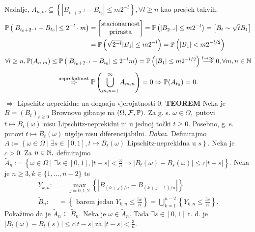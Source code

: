 \documentclass{article}
\begin{document}
Nadalje, \(A_{n,m}\subseteq\left\{\left|B_{t_0+2^{-l}}-B_{t_0}\right|\le m2^{-l}\right\},\forall l\ge n\) kao presjek takvih. \[\begin{aligned}\Bbb P\left(\left|B_{t_0+2^{-l}}-B_{t_0}\right|\le 2^{-l}\cdot m\right)&=\begin{bmatrix}\text{stacionarnost}\\\text{prirasta}\end{bmatrix}=\Bbb P\left(\left|B_{2^{-l}}\right|\le m2^{-l}\right)=\begin{bmatrix}B_t\sim\sqrt tB_1\end{bmatrix}\\&=\Bbb P\left(\sqrt{2^{-l}}|B_1|\le m2^{-l}\right)=\Bbb P\left(|B_1|<m2^{-l/2}\right)\end{aligned}\]
\[\forall l\ge n,\Bbb P(A_{n,m})\le\Bbb P\left(\left|B_{t_0+2^{-l}}-B_{t_0}\right|\le 2^{-l}m\right)=\Bbb P\left(|B_1|\le m2^{-l/2}\right)\overset{l\to\infty}{\longrightarrow}0,\forall m,n\in\Bbb N\] \[\overset{\text{neprekidnost}}{\Rightarrow}\Bbb P\left(\bigcup_{m,n=1}^\infty A_{m,n}\right)=0\Rightarrow\Bbb P(A_{t_0})=0.\] \(\Rightarrow\) Lipschitz-neprekidne na doga\dj{}aju vjerojatnosti \(0.\)\newline\newline
\textbf{TEOREM}\newline
Neka je \(B=(B_t)_{t\ge0}\) Brownovo gibanje na \((\Omega,\mathcal F,\Bbb P).\) Za g. s. \(\omega\in\Omega,\) putovi \(t\mapsto B_t(\omega)\) nisu Lipschitz-neprekidni ni u jednoj točki \(t\ge0.\) Posebno, g. s. putovi \(t\mapsto B_t(\omega)\) nigdje nisu diferencijabilni.\newline\newline
\textit{Dokaz.}\newline
Definirajmo \(A:=\left\{\omega\in\Omega\mid\exists s\in[0,1],t\mapsto B_t(\omega)\text{ Lipschitz-neprekidna u }s \right\}.\) Neka je \(c>0.\) Za \(n\in\Bbb N,\) definirajmo \(\tilde A_n:=\left\{\omega\in\Omega\mid\exists s\in[0,1],|t-s|<\frac3n\Rightarrow|B_t(\omega)-B_s(\omega)|\le c|t-s|\right\}.\) Neka je \(n\ge3,k\in\{1,\ldots,n-2\}\) te \[\begin{aligned}Y_{k,n}:&=\max_{j=0,1,2}\left\{\left|B_{(k+j)/n}-B_{(k+j-1)/n}\right|\right\}\\\tilde B_n:&=\left\{\text{ barem jedan }Y_{k,n}\le\frac{5c}n\right\}=\bigcup_{k=1}^{n-2}\left\{Y_{k,n}\le\frac{5c}n\right\}.\end{aligned}\] Pokažimo da je \(\tilde A_n\subseteq\tilde B_n.\) Neka je \(\omega\in\tilde A_n.\) Tada \(\exists s\in[0,1]\) t. d. je \(|B_t(\omega)-B_t(s)|\le c|t-s|\) za \(|t-s|<\frac3n.\)
\end{document}
